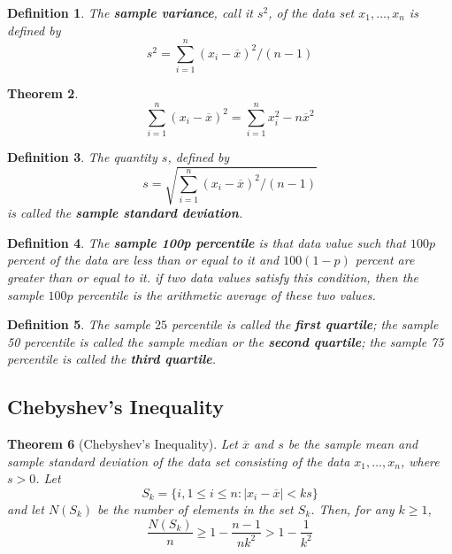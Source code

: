 \documentclass[12pt]{article}
\newtheorem{theorem}{Theorem}
\newtheorem{definition}[theorem]{Definition}
\begin{document}
\begin{definition}
  The \textbf{sample variance}, call it $s^2$, of the data set $x_1, \dots, x_n$ is defined by
  \begin{equation*}
    s^2 = \sum_{i=1}^n (x_i - \overline{x})^2/(n-1)
  \end{equation*}
\end{definition}

\begin{theorem}
  \begin{equation*}
    \sum_{i=1}^n (x_i - \overline{x})^2 = \sum_{i=1}^n x_i^2 - n \overline{x}^2
  \end{equation*}
\end{theorem}

\begin{definition}
  The quantity $s$, defined by
  \begin{equation*}
    s = \sqrt{\sum_{i=1}^n (x_i - \overline{x})^2 / (n-1)}
  \end{equation*}
  is called the \textbf{sample standard deviation}.
\end{definition}

\begin{definition}
  The \textbf{sample 100p percentile} is that data value such that $100p$ percent of the data are less than or equal to it and $100(1-p)$ percent are greater than or equal to it. if two data values satisfy this condition, then the sample $100p$ percentile is the arithmetic average of these two values.
\end{definition}

\begin{definition}
  The sample $25$ percentile is called the \textbf{first quartile}; the sample 50 percentile is called the sample median or the \textbf{second quartile}; the sample 75 percentile is called the \textbf{third quartile}.
\end{definition}

\subsection{Chebyshev's Inequality}

\begin{theorem}[Chebyshev's Inequality]
  Let $\overline{x}$ and $s$ be the sample mean and sample standard deviation of the data set consisting of the data $x_1, \dots, x_n$, where $s > 0$. Let
  \begin{equation*}
    S_k = \{ i, 1 \le i \le n: |x_i - \overline{x}| < ks \}
  \end{equation*}
  and let $N(S_k)$ be the number of elements in the set $S_k$. Then, for any $k \ge 1$,
  \begin{equation*}
    \frac {N(S_k)}{n} \ge 1 - \frac{n-1}{nk^2} > 1 - \frac {1}{k^2}
  \end{equation*}
\end{theorem}
\end{document}

